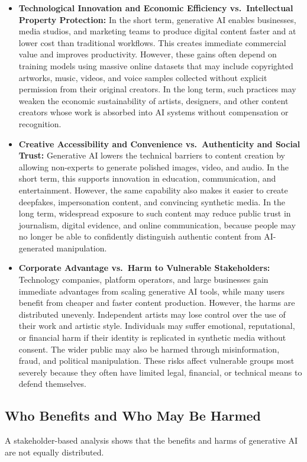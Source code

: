\begin{itemize}
  \item \textbf{Technological Innovation and Economic Efficiency vs.\ Intellectual Property Protection:} In the short term, generative AI enables businesses, media studios, and marketing teams to produce digital content faster and at lower cost than traditional workflows. This creates immediate commercial value and improves productivity. However, these gains often depend on training models using massive online datasets that may include copyrighted artworks, music, videos, and voice samples collected without explicit permission from their original creators. In the long term, such practices may weaken the economic sustainability of artists, designers, and other content creators whose work is absorbed into AI systems without compensation or recognition.

  \item \textbf{Creative Accessibility and Convenience vs.\ Authenticity and Social Trust:} Generative AI lowers the technical barriers to content creation by allowing non-experts to generate polished images, video, and audio. In the short term, this supports innovation in education, communication, and entertainment. However, the same capability also makes it easier to create deepfakes, impersonation content, and convincing synthetic media. In the long term, widespread exposure to such content may reduce public trust in journalism, digital evidence, and online communication, because people may no longer be able to confidently distinguish authentic content from AI-generated manipulation.

  \item \textbf{Corporate Advantage vs.\ Harm to Vulnerable Stakeholders:} Technology companies, platform operators, and large businesses gain immediate advantages from scaling generative AI tools, while many users benefit from cheaper and faster content production. However, the harms are distributed unevenly. Independent artists may lose control over the use of their work and artistic style. Individuals may suffer emotional, reputational, or financial harm if their identity is replicated in synthetic media without consent. The wider public may also be harmed through misinformation, fraud, and political manipulation. These risks affect vulnerable groups most severely because they often have limited legal, financial, or technical means to defend themselves.
\end{itemize}

\subsection{Who Benefits and Who May Be Harmed}\label{sec:benefits-harms}
A stakeholder-based analysis shows that the benefits and harms of generative AI are not equally distributed.

